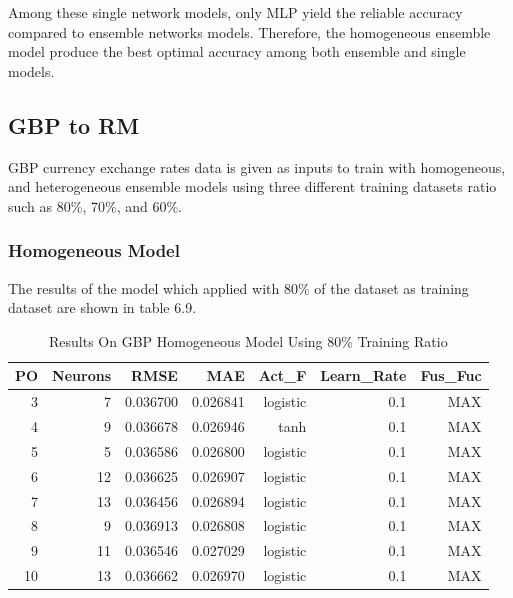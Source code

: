 {{{{{{{{{{{{{{{{Among these single network models, only MLP yield the reliable accuracy compared to ensemble networks models. Therefore, the homogeneous ensemble model produce the best optimal accuracy among both ensemble and single models.



	
\subsection{GBP to RM}
GBP currency exchange rates data is given as inputs to train with homogeneous, and heterogeneous ensemble models using three different training datasets ratio such as 80\%, 70\%, and 60\%. 

\subsubsection{Homogeneous Model}

The results of the model which applied with 80\% of the dataset as training dataset are shown in table 6.9. 

\setlength{\tabcolsep}{0.5em} %
{\renewcommand{\arraystretch}{1.2}
	\begin{table}[ht]
		
		\begin{tabular}{@{}rrrrrrr@{}}
			\toprule
			\textbf{PO}&\textbf{Neurons}& \textbf{RMSE} & \textbf{MAE} & \textbf{Act\_F}  & \textbf{Learn\_Rate} &\textbf{ Fus\_Fuc}\\ 
			\midrule
			 
			  3 & 7 & 0.036700 & 0.026841 & logistic & 0.1 & MAX \\ 
			  4 & 9 & 0.036678 & 0.026946 & tanh & 0.1 & MAX \\ 
			  5 & 5 & 0.036586 & 0.026800 & logistic & 0.1 & MAX \\ 
			  6 & 12 & 0.036625 & 0.026907 & logistic & 0.1 & MAX \\ 
			  7 & 13 & 0.036456 & 0.026894 & logistic & 0.1 & MAX \\ 
			  8 & 9 & 0.036913 & 0.026808 & logistic & 0.1 & MAX \\ 
			  9 & 11 & 0.036546 & 0.027029 & logistic & 0.1 & MAX \\ 
			  10 & 13 & 0.036662 & 0.026970 & logistic & 0.1 & MAX \\ 
			 \hline
			   
			\hline
		\end{tabular}
		\hspace*{1cm}
		\caption{Results On GBP Homogeneous Model Using 80\% Training Ratio }
	\end{table}	
	
}}}}}}}}}}}}}}}}}

